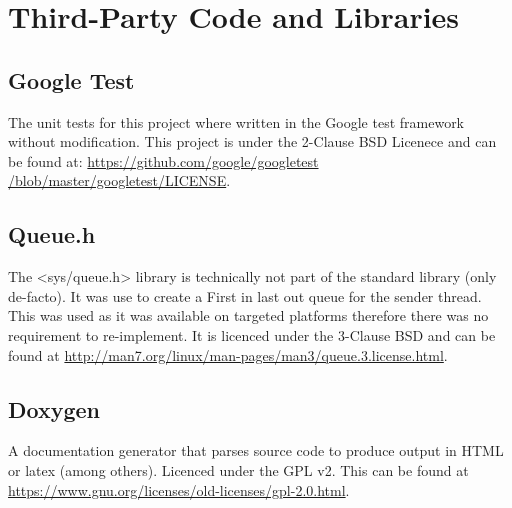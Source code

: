 \chapter{Third-Party Code and Libraries}

\section*{Google Test}
The unit tests for this project where written in the Google test framework\cite{google_tests} without modification. This project is under the 2-Clause BSD Licenece and can be found at: \url{https://github.com/google/googletest /blob/master/googletest/LICENSE}.



\section*{Queue.h}
The <sys/queue.h> library is technically not part of the standard library (only de-facto). It was use to create a First in last out queue for the sender thread. This was used as it was available on targeted platforms therefore there was no requirement to re-implement. It is licenced under the 3-Clause BSD and can be found at \url{http://man7.org/linux/man-pages/man3/queue.3.license.html}.

\section*{Doxygen}
A documentation generator that parses source code to produce output in HTML or latex (among others). Licenced under the GPL v2. This can be found at \url{https://www.gnu.org/licenses/old-licenses/gpl-2.0.html}.
